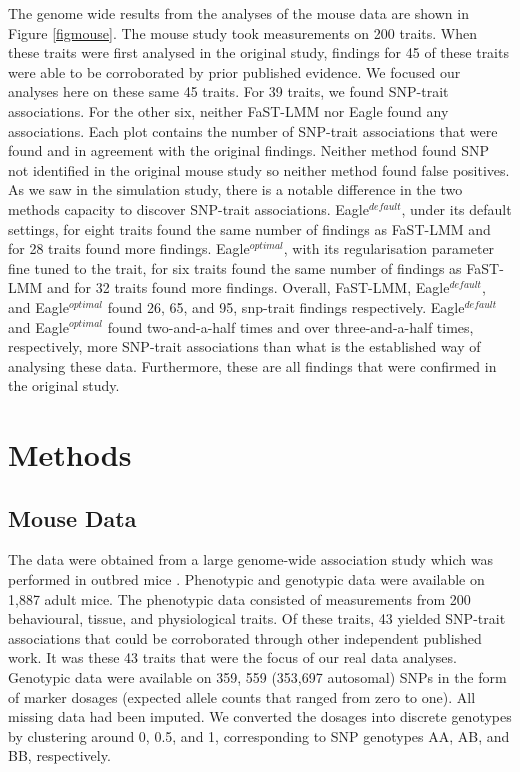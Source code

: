 \documentclass{article}
\begin{document}
The genome wide results from the analyses of the mouse data are shown in Figure  \ref{figmouse}. The mouse study took
measurements on 200 traits. When these traits were first analysed in the original study, findings for 45 of these traits were able to be 
corroborated by prior published evidence. We focused our analyses here on these same 45 traits. For 39 traits, we found SNP-trait associations. 
For the other six, neither FaST-LMM nor Eagle found any associations. 
Each plot contains the number of SNP-trait associations that were found and in agreement with the original findings. 
Neither method found SNP not identified in the original mouse study so neither method found false positives. 
As we saw in the simulation study, there is a notable difference in the two methods capacity to discover SNP-trait associations. Eagle$^{default}$, under its default settings, for eight traits found the same number of findings as FaST-LMM and for 28 traits found more findings. Eagle$^{optimal}$, 
with its regularisation parameter fine tuned to the trait, for six traits found the same number of findings as FaST-LMM and for 32 traits 
found more findings. Overall, FaST-LMM, Eagle$^{default}$, and Eagle$^{optimal}$ found 26, 65, and 95, snp-trait findings respectively. 
Eagle$^{default}$ and Eagle$^{optimal}$ found two-and-a-half times and over three-and-a-half times, respectively, more SNP-trait 
associations than what is the established way of analysing these data. Furthermore, these are all findings that were confirmed in the original study. 



\section{Methods}


\subsection{Mouse Data}

The data were obtained from a large genome-wide association study which was performed in outbred mice \cite{nicod2016genome}. 
Phenotypic and genotypic data were available on 1,887 adult mice. 
The phenotypic data consisted of measurements from 200 behavioural, tissue, and physiological traits.  Of these traits, 
43 yielded SNP-trait associations that could be corroborated through other independent published work. It was these 
43 traits that were the focus of our real data analyses. Genotypic data were available on 359, 559 (353,697 autosomal) SNPs in the 
form of marker dosages (expected allele counts that ranged from zero to one). All missing data had been imputed. 
We converted the dosages into discrete genotypes 
by clustering around 0, 0.5, and 1, corresponding to SNP genotypes AA, AB, and BB, respectively. 
\end{document}
